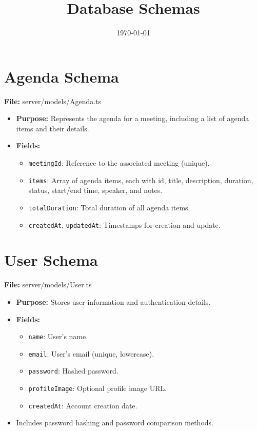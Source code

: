 \documentclass{article}
\title{Database Schemas}
\date{\today}
\begin{document}
\maketitle

\section*{Agenda Schema}
\textbf{File:} server/models/Agenda.ts

\begin{itemize}[leftmargin=*]
  \item \textbf{Purpose:} Represents the agenda for a meeting, including a list of agenda items and their details.
  \item \textbf{Fields:}
    \begin{itemize}
      \item \texttt{meetingId}: Reference to the associated meeting (unique).
      \item \texttt{items}: Array of agenda items, each with id, title, description, duration, status, start/end time, speaker, and notes.
      \item \texttt{totalDuration}: Total duration of all agenda items.
      \item \texttt{createdAt}, \texttt{updatedAt}: Timestamps for creation and update.
    \end{itemize}
\end{itemize}

\section*{User Schema}
\textbf{File:} server/models/User.ts

\begin{itemize}[leftmargin=*]
  \item \textbf{Purpose:} Stores user information and authentication details.
  \item \textbf{Fields:}
    \begin{itemize}
      \item \texttt{name}: User's name.
      \item \texttt{email}: User's email (unique, lowercase).
      \item \texttt{password}: Hashed password.
      \item \texttt{profileImage}: Optional profile image URL.
      \item \texttt{createdAt}: Account creation date.
    \end{itemize}
  \item Includes password hashing and password comparison methods.
\end{itemize}
\end{document}
